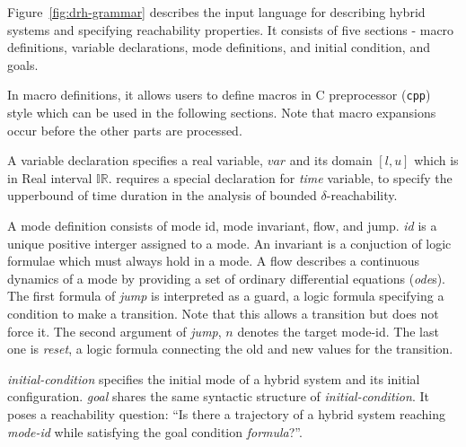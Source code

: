 Figure~\ref{fig:drh-grammar} describes the input language \drh{} for
describing hybrid systems and specifying reachability properties. It
consists of five sections - macro definitions, variable declarations,
mode definitions, and initial condition, and goals.

In macro definitions, it allows users to define macros in C
preprocessor (\texttt{cpp}) style which can be used in the following
sections. Note that macro expansions occur before the other parts are
processed.

A variable declaration specifies a real variable, $var$ and its domain
$[l, u]$ which is in Real interval $\mathbb{IR}$. \drh{} requires a
special declaration for \textit{time} variable, to specify the
upperbound of time duration in the analysis of bounded
$\delta$-reachability.

A mode definition consists of mode id, mode invariant, flow, and jump.
\textit{id} is a unique positive interger assigned to a mode. An
invariant is a conjuction of logic formulae which must always hold in
a mode. A flow describes a continuous dynamics of a mode by providing
a set of ordinary differential equations (\textit{ode}s). The first
formula of \textit{jump} is interpreted as a guard, a logic formula
specifying a condition to make a transition. Note that this allows a
transition but does not force it. The second argument of
\textit{jump}, $n$ denotes the target mode-id. The last one is
\textit{reset}, a logic formula connecting the old and new values for
the transition.

\textit{initial-condition} specifies the initial mode of a hybrid
system and its initial configuration. \textit{goal} shares the same
syntactic structure of \textit{initial-condition}. It poses a
reachability question: ``Is there a trajectory of a hybrid system
reaching \textit{mode-id} while satisfying the goal condition
\textit{formula}?''.

